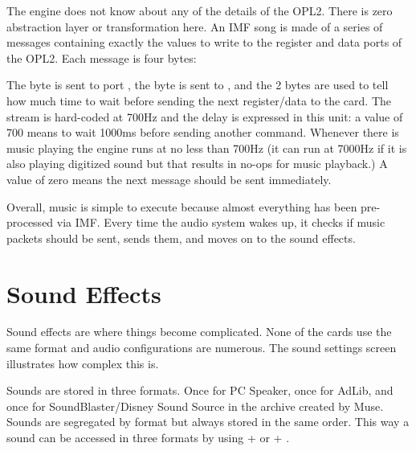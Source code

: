 \par
The engine does not know about any of the details of the OPL2. There is zero abstraction layer or transformation here. An IMF song is made of a series of messages containing exactly the values to write to the register and data ports of the OPL2. Each message is four bytes:\\
\par
\begin{minipage}{\textwidth}

\end{minipage}
\par
The  byte is sent to port , the  byte is sent to , and the  2 bytes are used to tell how much time to wait before sending the next register/data to the card. The stream is hard-coded at 700Hz and the delay is expressed in this unit: a value of 700 means to wait 1000ms before sending another command. Whenever there is music playing the engine runs at no less than 700Hz (it can run at 7000Hz if it is also playing digitized sound but that results in no-ops for music playback.) A value of zero means the next message should be sent immediately.\\
\par
Overall, music is simple to execute because almost everything has been pre-processed via IMF. Every time the audio system wakes up, it checks if music packets should be sent, sends them, and moves on to the sound effects.










\section{Sound Effects}
Sound effects are where things become complicated. None of the cards use the same format and audio configurations are numerous. The sound settings screen illustrates how complex this is.
\par
\begin{figure}[H]
\centering
 \end{figure}
\par
Sounds are stored in three formats. Once for PC Speaker, once for AdLib, and once for SoundBlaster/Disney Sound Source in the  archive created by Muse. Sounds are segregated by format but always stored in the same order. This way a sound can be accessed in three formats by using  +  or  + .\\

